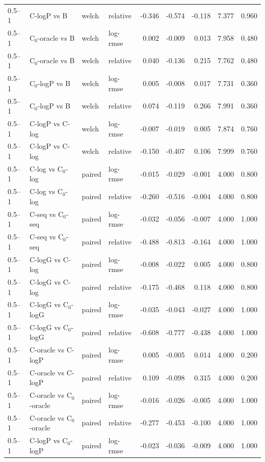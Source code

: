 \begin{longtable}{llllrrrrr}
0.5–1 & C-logP vs B & welch & relative & -0.346 & -0.574 & -0.118 & 7.377 & 0.960 \\
0.5–1 & C$_0$-oracle vs B & welch & log-rmse & 0.002 & -0.009 & 0.013 & 7.958 & 0.480 \\
0.5–1 & C$_0$-oracle vs B & welch & relative & 0.040 & -0.136 & 0.215 & 7.762 & 0.480 \\
0.5–1 & C$_0$-logP vs B & welch & log-rmse & 0.005 & -0.008 & 0.017 & 7.731 & 0.360 \\
0.5–1 & C$_0$-logP vs B & welch & relative & 0.074 & -0.119 & 0.266 & 7.991 & 0.360 \\
0.5–1 & C-logP vs C-log & welch & log-rmse & -0.007 & -0.019 & 0.005 & 7.874 & 0.760 \\
0.5–1 & C-logP vs C-log & welch & relative & -0.150 & -0.407 & 0.106 & 7.999 & 0.760 \\
0.5–1 & C-log vs C$_0$-log & paired & log-rmse & -0.015 & -0.029 & -0.001 & 4.000 & 0.800 \\
0.5–1 & C-log vs C$_0$-log & paired & relative & -0.260 & -0.516 & -0.004 & 4.000 & 0.800 \\
0.5–1 & C-seq vs C$_0$-seq & paired & log-rmse & -0.032 & -0.056 & -0.007 & 4.000 & 1.000 \\
0.5–1 & C-seq vs C$_0$-seq & paired & relative & -0.488 & -0.813 & -0.164 & 4.000 & 1.000 \\
0.5–1 & C-logG vs C-log & paired & log-rmse & -0.008 & -0.022 & 0.005 & 4.000 & 0.800 \\
0.5–1 & C-logG vs C-log & paired & relative & -0.175 & -0.468 & 0.118 & 4.000 & 0.800 \\
0.5–1 & C-logG vs C$_0$-logG & paired & log-rmse & -0.035 & -0.043 & -0.027 & 4.000 & 1.000 \\
0.5–1 & C-logG vs C$_0$-logG & paired & relative & -0.608 & -0.777 & -0.438 & 4.000 & 1.000 \\
0.5–1 & C-oracle vs C-logP & paired & log-rmse & 0.005 & -0.005 & 0.014 & 4.000 & 0.200 \\
0.5–1 & C-oracle vs C-logP & paired & relative & 0.109 & -0.098 & 0.315 & 4.000 & 0.200 \\
0.5–1 & C-oracle vs C$_0$-oracle & paired & log-rmse & -0.016 & -0.026 & -0.005 & 4.000 & 1.000 \\
0.5–1 & C-oracle vs C$_0$-oracle & paired & relative & -0.277 & -0.453 & -0.100 & 4.000 & 1.000 \\
0.5–1 & C-logP vs C$_0$-logP & paired & log-rmse & -0.023 & -0.036 & -0.009 & 4.000 & 1.000 \\

\end{longtable}
